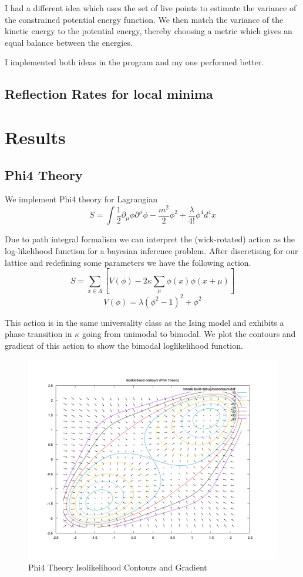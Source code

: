 \documentclass[11pt]{article}
\begin{document}
    I had a different idea which uses the set of live points to estimate the variance of the constrained
    potential energy function.
    We then match the variance of the kinetic energy to the potential energy, thereby
    choosing a metric which gives an equal balance between the energies.

    I implemented both ideas in the program and my one performed better.

    \subsection{Reflection Rates for local minima}

    \newpage
    \section{Results}
    \subsection{Phi4 Theory}
    We implement Phi4 theory for Lagrangian
    \[
        S = \int{\frac{1}{2} \partial_{\mu} \phi \partial^{\mu} \phi
    -\frac{m^2}{2} \phi^2  + \frac{\lambda}{4!} \phi^4 d^4x}
    \]

    Due to path integral formalism we can interpret the (wick-rotated) action as the log-likelihood function
    for a bayesian inference problem.
    After discretising for our lattice and redefining some parameters we have the following action.
    \[
        S = \sum_{x \in \Lambda} \left[ V(\phi) - 2\kappa \sum_{\mu}{\phi(x)\phi(x+\mu)} \right]
    \]
    \[
        V(\phi) = \lambda (\phi^2 - 1)^2 + \phi^2
    \]

    This action is in the same universality class as the Ising model and exhibits a phase transition
    in $\kappa$ going from unimodal to bimodal. We plot the contours and gradient of this action
    to show the bimodal loglikelihood function.

    \begin{figure}[H]
        \centering
        \includegraphics[width=0.75\linewidth]{../figures/phi4_isocontours}
        \caption{Phi4 Theory Isolikelihood Contours and Gradient}
        \label{fig:phi4contour}
    \end{figure}
\end{document}
